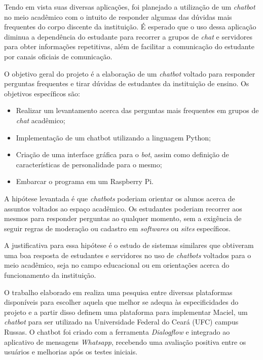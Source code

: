 \documentclass[12pt]{article}
\begin{document}
Tendo em vista suas diversas aplicações, foi planejado a utilização de um {\itshape chatbot} no meio acadêmico com o intuito de responder algumas das dúvidas mais frequentes do corpo discente da instituição. É esperado que o uso dessa aplicação diminua a dependência do estudante para recorrer a grupos de {\itshape chat} e servidores para obter informações repetitivas, além de facilitar a comunicação do estudante por canais oficiais de comunicação.

O objetivo geral do projeto é a elaboração de um {\itshape chatbot} voltado para responder perguntas frequentes e tirar dúvidas de estudantes da instituição de ensino. Os objetivos específicos são: 


\begin{itemize}
  \item Realizar um levantamento acerca das perguntas mais frequentes em grupos de {\itshape chat} acadêmico;
  \item Implementação de um chatbot utilizando a linguagem Python;
  \item Criação de uma interface gráfica para o {\itshape bot}, assim como definição de características de personalidade para o mesmo;
  \item Embarcar o programa em um Raspberry Pi.
\end{itemize}

A hipótese levantada é que {\itshape chatbots} poderiam orientar os alunos acerca de assuntos voltados ao espaço acadêmico. Os estudantes poderiam recorrer aos mesmos para responder perguntas ao qualquer momento, sem a exigência de seguir regras de moderação ou cadastro em {\itshape softwares} ou {\itshape sites} específicos.

A justificativa para essa hipótese é o estudo de sistemas similares que obtiveram uma boa resposta de estudantes e servidores no uso de {\itshape chatbots} voltados para o meio acadêmico, seja no campo educacional ou em orientações acerca do funcionamento da instituição.



O trabalho elaborado em \cite{maciel:19} realiza uma pesquisa entre diversas plataformas disponíveis para escolher aquela que melhor se adequa às especificidades do projeto e a partir disso definem uma plataforma para implementar Maciel, um {\itshape chatbot} para ser utilizado na Universidade Federal do Ceará (UFC) campus Russas. O chatbot foi criado com a ferramenta {\itshape Dialogflow} e integrado ao aplicativo de mensagens {\itshape Whatsapp}, recebendo uma avaliação positiva entre os usuários e melhorias após os testes iniciais.
\end{document}
